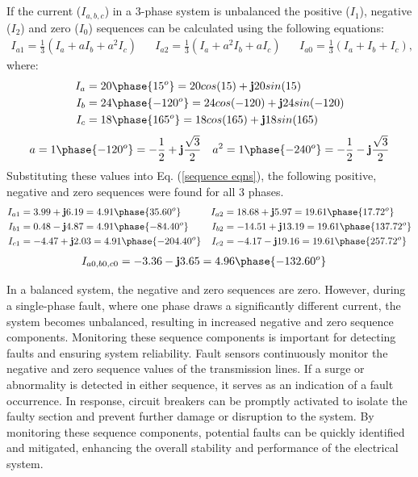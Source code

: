     \subsection{}
        If the current (\(I_{a, b, c}\)) in a 3-phase system is unbalanced the positive (\(I_1\)), negative (\(I_2\)) and zero (\(I_0\)) sequences can be calculated using the following equations:
        \begin{align}
            I_{a1} = \frac{1}{3}\left(I_a + aI_b + a^2I_c\right) && I_{a2} = \frac{1}{3}\left(I_a + a^2I_b + aI_c\right) && I_{a0} = \frac{1}{3}\left(I_a + I_b + I_c\right), \label{sequence eqns}
        \end{align}
        where:
        \begin{align}
            I_a &= 20\phase{15^o} = 20cos(15) + \textbf{j}20sin(15) \\
            I_b &= 24\phase{-120^o} = 24cos(-120) + \textbf{j}24sin(-120) \\
            I_c &= 18\phase{165^o} = 18cos(165) + \textbf{j}18sin(165)
        \end{align}
        \begin{align}
            a = 1\phase{-120^o} = -\frac{1}{2} + \textbf{j}\frac{\sqrt{3}}{2} && a^2 = 1\phase{-240^o} = -\frac{1}{2} - \textbf{j}\frac{\sqrt{3}}{2}
        \end{align}
        Substituting these values into Eq. (\ref{sequence eqns}), the following positive, negative and zero sequences were found for all 3 phases.
        \begin{align}
            I_{a1} &= 3.99 + \textbf{j}6.19 = 4.91\phase{35.60^o} & I_{a2} &= 18.68 + \textbf{j}5.97 = 19.61\phase{17.72^o} \\ I_{b1} &= 0.48 - \textbf{j}4.87 = 4.91\phase{-84.40^o} & I_{b2} &= -14.51 + \textbf{j}13.19 = 19.61\phase{137.72^o}\\
            I_{c1} &= -4.47 + \textbf{j}2.03 = 4.91\phase{-204.40^o} & I_{c2} &= -4.17 - \textbf{j}19.16 = 19.61\phase{257.72^o}
        \end{align}
        \begin{align}
            I_{a0, b0, c0} &= -3.36 - \textbf{j}3.65 = 4.96\phase{-132.60^o}
        \end{align}

        In a balanced system, the negative and zero sequences are zero. However, during a single-phase fault, where one phase draws a significantly different current, the system becomes unbalanced, resulting in increased negative and zero sequence components. Monitoring these sequence components is important for detecting faults and ensuring system reliability. Fault sensors continuously monitor the negative and zero sequence values of the transmission lines. If a surge or abnormality is detected in either sequence, it serves as an indication of a fault occurrence. In response, circuit breakers can be promptly activated to isolate the faulty section and prevent further damage or disruption to the system. By monitoring these sequence components, potential faults can be quickly identified and mitigated, enhancing the overall stability and performance of the electrical system.